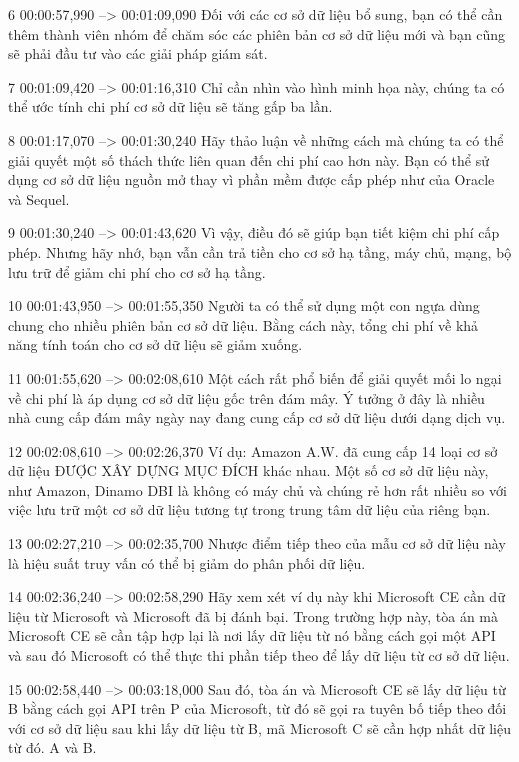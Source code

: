 6
00:00:57,990 --> 00:01:09,090
Đối với các cơ sở dữ liệu bổ sung, bạn có thể cần thêm thành viên nhóm để chăm sóc các phiên bản cơ sở dữ liệu mới và bạn cũng sẽ phải đầu tư vào các giải pháp giám sát.

7
00:01:09,420 --> 00:01:16,310
Chỉ cần nhìn vào hình minh họa này, chúng ta có thể ước tính chi phí cơ sở dữ liệu sẽ tăng gấp ba lần.

8
00:01:17,070 --> 00:01:30,240
Hãy thảo luận về những cách mà chúng ta có thể giải quyết một số thách thức liên quan đến chi phí cao hơn này.  Bạn có thể sử dụng cơ sở dữ liệu nguồn mở thay vì phần mềm được cấp phép như của Oracle và Sequel.

9
00:01:30,240 --> 00:01:43,620
Vì vậy, điều đó sẽ giúp bạn tiết kiệm chi phí cấp phép.  Nhưng hãy nhớ, bạn vẫn cần trả tiền cho cơ sở hạ tầng, máy chủ, mạng, bộ lưu trữ để giảm chi phí cho cơ sở hạ tầng.

10
00:01:43,950 --> 00:01:55,350
Người ta có thể sử dụng một con ngựa dùng chung cho nhiều phiên bản cơ sở dữ liệu.  Bằng cách này, tổng chi phí về khả năng tính toán cho cơ sở dữ liệu sẽ giảm xuống.

11
00:01:55,620 --> 00:02:08,610
Một cách rất phổ biến để giải quyết mối lo ngại về chi phí là áp dụng cơ sở dữ liệu gốc trên đám mây.  Ý tưởng ở đây là nhiều nhà cung cấp đám mây ngày nay đang cung cấp cơ sở dữ liệu dưới dạng dịch vụ.

12
00:02:08,610 --> 00:02:26,370
Ví dụ: Amazon A.W.  đã cung cấp 14 loại cơ sở dữ liệu ĐƯỢC XÂY DỰNG MỤC ĐÍCH khác nhau.  Một số cơ sở dữ liệu này, như Amazon, Dinamo DBI là không có máy chủ và chúng rẻ hơn rất nhiều so với việc lưu trữ một cơ sở dữ liệu tương tự trong trung tâm dữ liệu của riêng bạn.

13
00:02:27,210 --> 00:02:35,700
Nhược điểm tiếp theo của mẫu cơ sở dữ liệu này là hiệu suất truy vấn có thể bị giảm do phân phối dữ liệu.

14
00:02:36,240 --> 00:02:58,290
Hãy xem xét ví dụ này khi Microsoft CE cần dữ liệu từ Microsoft và Microsoft đã bị đánh bại.  Trong trường hợp này, tòa án mà Microsoft CE sẽ cần tập hợp lại là nơi lấy dữ liệu từ nó bằng cách gọi một API và sau đó Microsoft có thể thực thi phần tiếp theo để lấy dữ liệu từ cơ sở dữ liệu.

15
00:02:58,440 --> 00:03:18,000
Sau đó, tòa án và Microsoft CE sẽ lấy dữ liệu từ B bằng cách gọi API trên P của Microsoft, từ đó sẽ gọi ra tuyên bố tiếp theo đối với cơ sở dữ liệu sau khi lấy dữ liệu từ B, mã Microsoft C sẽ cần hợp nhất dữ liệu từ đó.  A và B.

